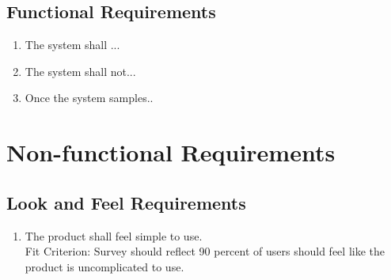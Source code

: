 \documentclass[12pt, titlepage]{article}
\begin{document}
\subsection{Functional Requirements}
\begin{enumerate}[{FR}1.] 
    \item
    The system shall ... 
    \item
    The system shall not...
    \item
    Once the system samples..
	
\end{enumerate}

\section{Non-functional Requirements}


\subsection{Look and Feel Requirements}
\begin{adjustwidth}{2.2em}{0pt}
\begin{enumerate}[{NFR-L}1.]
   \item The product shall feel simple to use.\\
   Fit Criterion: Survey should reflect 90 percent of users should feel like the product is uncomplicated to use.
\end{enumerate}
\end{adjustwidth}
 
\end{document}
